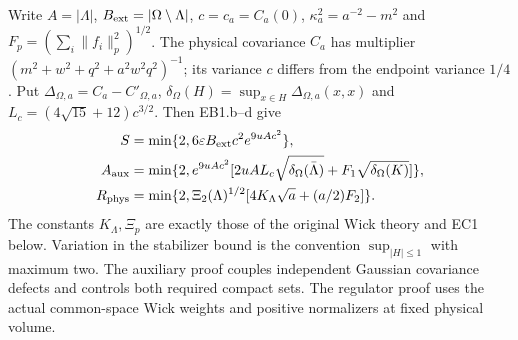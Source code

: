 \documentclass[11pt]{article}
\theoremstyle{plain}
\theoremstyle{definition}
\theoremstyle{remark}
\begin{document}
Write $A=|\Lambda|$, $B_{\rm ext}=|\Omega\setminus\Lambda|$,
$c=c_a=C_a(0)$, $\kappa_a^2=a^{-2}-m^2$ and
$F_p=(\sum_i\|f_i\|_p^2)^{1/2}$.
The physical covariance $C_a$ has multiplier
$(m^2+w^2+q^2+a^2w^2q^2)^{-1}$; its variance $c$ differs from the
endpoint variance $1/4$. Put
$\Delta_{\Omega,a}=C_a-C'_{\Omega,a}$,
$\delta_\Omega(H)=\sup_{x\in H}\Delta_{\Omega,a}(x,x)$ and
$L_c=(4\sqrt{15}+12)c^{3/2}$. Then EB1.b--d give
\begin{align}
 S&=\min\{2,6\varepsilon B_{\rm ext}c^2e^{9uAc^2}\},
 \label{qrs:physical-errors}\\
 A_{\rm aux}&=\min\{2,e^{9uAc^2}
       [2uAL_c\sqrt{\delta_\Omega(\bar\Lambda)}
                  +F_1\sqrt{\delta_\Omega(K)}]\},\nonumber\\
 R_{\rm phys}&=\min\{2,\Xi_2(\Lambda)^{1/2}
                      [4K_\Lambda\sqrt a+(a/2)F_2]\}.
 \nonumber
\end{align}
The constants $K_\Lambda,\Xi_p$ are exactly those of the original Wick
theory and EC1 below. Variation in the stabilizer bound is the convention
$\sup_{|H|\le1}$ with maximum two. The auxiliary proof couples independent
Gaussian covariance defects and controls both required compact sets.
The regulator proof uses the actual common-space Wick weights and positive
normalizers at fixed physical volume.
\end{document}
